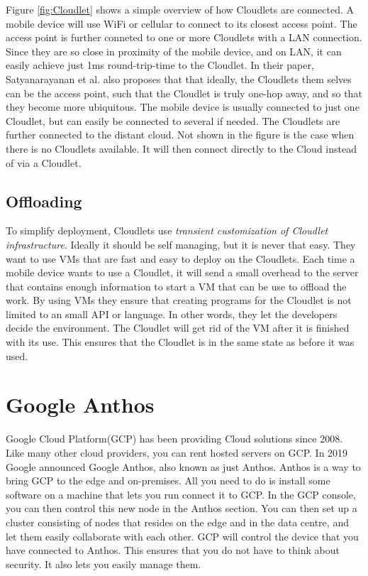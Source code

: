 Figure \ref{fig:Cloudlet} shows a simple overview of how Cloudlets are connected. A mobile device will use WiFi or cellular to connect to its closest access point. The access point is further conneted to one or more Cloudlets with a LAN connection. Since they are so close in proximity of the mobile device, and on LAN, it can easily achieve just 1ms round-trip-time to the Cloudlet. In their paper, Satyanarayanan et al.\cite{satyanarayanan_case_2009} also proposes that that ideally, the Cloudlets them selves can be the access point, such that the Cloudlet is truly one-hop away, and so that they become more ubiquitous. The mobile device is usually connected to just one Cloudlet, but can easily be connected to several if needed. The Cloudlets are further connected to the distant cloud. Not shown in the figure is the case when there is no Cloudlets available. It will then connect directly to the Cloud instead of via a Cloudlet. 


\subsection{Offloading}
To simplify deployment, Cloudlets use \textit{transient customization of Cloudlet infrastructure}. Ideally it should be self managing, but it is never that easy. They want to use VMs that are fast and easy to deploy on the Cloudlets. Each time a mobile device wants to use a Cloudlet, it will send a small overhead to the server that contains enough information to start a VM that can be use to offload the work. By using VMs they ensure that creating programs for the Cloudlet is not limited to an small API or language. In other words, they let the developers decide the environment. The Cloudlet will get rid of the VM after it is finished with its use. This ensures that the Cloudlet is in the same state as before it was used.






\section{Google Anthos}
Google Cloud Platform(GCP) has been providing Cloud solutions since 2008. Like many other cloud providers, you can rent hosted servers on GCP. In 2019 Google announced Google Anthos, also known as just Anthos. Anthos is a way to bring GCP to the edge and on-premises\cite{noauthor_anthos_nodate}. All you need to do is install some software on a machine that lets you run connect it to GCP. In the GCP console, you can then control this new node in the Anthos section. You can then set up a cluster consisting of nodes that resides on the edge and in the data centre, and let them easily collaborate with each other. GCP will control the device that you have connected to Anthos. This ensures that you do not have to think about security. It also lets you easily manage them.

